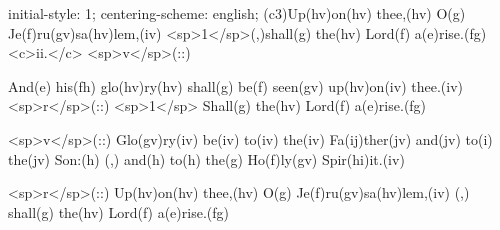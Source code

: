 initial-style: 1;
centering-scheme: english;
(c3)Up(hv)on(hv) thee,(hv) O(g) Je(f)ru(gv)sa(hv)lem,(iv) <sp>1</sp>(,)shall(g) the(hv) Lord(f) a(e)rise.(fg) <c>ii.</c> <sp>v</sp>(::)

And(e) his(fh) glo(hv)ry(hv) shall(g) be(f) seen(gv) up(hv)on(iv) thee.(iv) <sp>r</sp>(::) <sp>1</sp> Shall(g) the(hv) Lord(f) a(e)rise.(fg)

<sp>v</sp>(::) Glo(gv)ry(iv) be(iv) to(iv) the(iv) Fa(ij)ther(jv) and(jv) to(i) the(jv) Son:(h) (,) and(h) to(h) the(g) Ho(f)ly(gv) Spir(hi)it.(iv)

<sp>r</sp>(::) Up(hv)on(hv) thee,(hv) O(g) Je(f)ru(gv)sa(hv)lem,(iv) (,) shall(g) the(hv) Lord(f) a(e)rise.(fg)